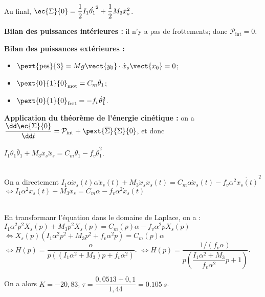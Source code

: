\begin{multicols}{2}
\begin{multicols}{2}
\begin{corrige}
Au final, $\ec{\Sigma}{0}=\dfrac{1}{2}I_1\dot{\theta_1}^2 + \dfrac{1}{2}M_3\dot{x}_s ^2$.

\textbf{Bilan des puissances intérieures :} il n'y a pas de frottements; donc  $\mathcal{P}_{\text{int}}=0$.

\textbf{Bilan des puissances extérieures :}
\begin{itemize}
\item $\pext{\text{pes}}{3}=Mg\vect{y_0}\cdot \dot{x}_s \vect{x_0} = 0$;
\item $\pext{0}{1}{0}_{\text{mot}}=C_m\dot{\theta}_1$;
\item $\pext{0}{1}{0}_{\text{frot}}=-f_v\dot{\theta}_1^2$.
\end{itemize}

\textbf{Application du théorème de l'énergie cinétique :} on a $\dfrac{\dd \ec{\Sigma}{0} }{\dd t}=\mathcal{P}_{\text{int}} + \pext{\overline{\Sigma}}{\Sigma}{0}$, et donc 

$ I_1\dot{\theta_1}\ddot{\theta_1} + M_3\dot{x}_s\ddot{x}_s =C_m\dot{\theta}_1 -f_v\dot{\theta}_1^2$.


\end{corrige}
\else
\fi


\ifprof
\begin{corrige}~\\
On a directement $ I_1\alpha \dot{x}_s(t)\alpha \ddot{x}_s(t) + M_3\dot{x}_s\ddot{x}_s(t) =C_m\alpha \dot{x}_s(t) -f_v\alpha^2\dot{ x_s(t)}^2$
$\Leftrightarrow 
 I_1\alpha^2 \ddot{x}_s(t) + M_3\ddot{x}_s =C_m\alpha  -f_v\alpha^2 \dot{x}_s(t)$
\end{corrige}
\else
\fi


\ifprof
\begin{corrige}~\\
En transformanr l'équation dans le domaine de Laplace, on a : $I_1\alpha^2 p^2X_s(p) + M_3p^2X_s(p) =C_m(p)\alpha  -f_v\alpha^2 pX_s(p)$
$\Leftrightarrow X_s(p) \left(I_1\alpha^2 p^2+ M_3p^2+f_v\alpha^2 p\right) =C_m(p)\alpha  $
$\Leftrightarrow H(p) = \dfrac{\alpha}{p\left(\left(I_1\alpha^2+ M_3\right)p+f_v\alpha^2 \right)} $.
$\Leftrightarrow H(p) = \dfrac{1/\left(f_v\alpha\right)}{p\left(\dfrac{I_1\alpha^2+ M_3}{f_v\alpha^2}p+1 \right)} $.

On a alors $K=-20,83$, $\tau = \dfrac{0,0513+ 0,1}{1,44}=\SI{0,105}{s}$.
\end{corrige}
\else
\fi


\ifprof
\end{multicols}
\else
\end{multicols}
\fi




